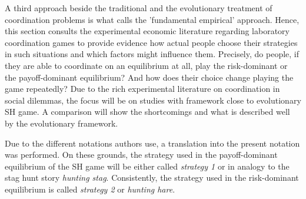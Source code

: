 \label{sec:experimentalevidence}
A third approach beside the traditional and the evolutionary treatment of 
coordination problems is what \textcite{camerer_behavioral_2003} calls the 
'fundamental empirical' approach.
Hence, this section consults the experimental economic literature regarding 
laboratory coordination games to provide evidence how actual people choose
their strategies in such situations and which factors might influence them. 
Precisely, do people, if they are able to coordinate on an equilibrium at all,
play the risk-dominant or the payoff-dominant equilibrium? And how does their
choice change playing the game repeatedly?
Due to the rich experimental literature on coordination in social 
dilemmas, the focus will be on studies with framework close to  
evolutionary SH game. A comparison will show the shortcomings and what
is described well by the evolutionary framework.
 
Due to the different notations authors use, a translation into the present
notation was performed.
On these grounds, the 
strategy used in the payoff-dominant equilibrium of the SH game will be 
either called  \textit{strategy 1} or in analogy to the stag hunt story 
\textit{hunting stag}.
Consistently, the strategy used in the risk-dominant equilibrium is called
\textit{strategy 2} or \textit{hunting hare}. 


